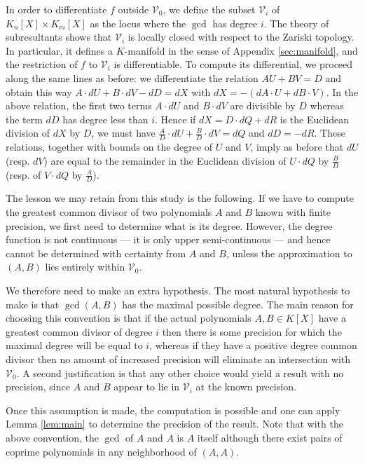 \documentclass{lms}
\begin{document}
In order to differentiate $f$ outside $\mathcal V_0$, we 
define the subset $\mathcal V_i$ of $K_n[X] \times 
K_m[X]$ as the locus where the $\gcd$ has degree $i$. The theory of 
subresultants shows that $\mathcal V_i$ is locally closed with respect to 
the Zariski topology. In particular, it defines a $K$-manifold in the 
sense of Appendix \ref{sec:manifold}, and the 
restriction of $f$ to $\mathcal V_i$ is differentiable. To compute
its differential, we proceed along the same lines as before: we 
differentiate the relation $AU + BV = D$ and obtain this way
$A \cdot dU + B \cdot dV - dD = dX$
with $dX = - (dA \cdot U + dB \cdot V)$. In the above relation, the
first two terms $A{\cdot}dU$ and $B{\cdot}dV$ are divisible by $D$ 
whereas the term $dD$ has degree less than $i$. 
Hence if $dX = D \cdot dQ + dR$ is the Euclidean division of $dX$ by $D$, 
we must have $\frac A D \cdot dU + \frac B D \cdot dV = dQ$ and $dD = 
-dR$. These relations, together with bounds on the degree of $U$ and $V$,
imply as before that $dU$ (resp. $dV$) are equal to the remainder in the
Euclidean division of $U{\cdot}dQ$ by $\frac B D$ (resp. of $V{\cdot}dQ$
by $\frac A D$).

\medskip

The lesson we may retain from this study is the following. If we have to 
compute the greatest common divisor of two polynomials $A$ and $B$ known 
with finite precision, we first need to determine what is its degree. 
However, the degree function is not continuous --- it is only upper 
semi-continuous --- and hence cannot be determined with certainty from $A$ and 
$B$, unless the approximation to $(A,B)$ lies entirely within $\mathcal V_0$.

We therefore need to make an extra hypothesis.  The most natural hypothesis to make
is that $\gcd(A, B)$ has the maximal possible degree.  The main reason for choosing
this convention is that if the actual polynomials $A, B \in K[X]$ have a greatest common
divisor of degree $i$ then there is some precision for which the maximal degree will be
equal to $i$, whereas if they have a positive
degree common divisor then no amount of increased precision will eliminate an intersection
with $\mathcal V_0$.  A second justification is that any other choice would yield a result
with no precision, since $A$ and $B$ appear to lie in $\mathcal V_i$ at the known precision.


Once this assumption is made, the computation is possible and one can apply Lemma 
\ref{lem:main} to determine the precision of the result.
Note that with the above convention, the $\gcd$ of $A$ and $A$ is $A$ 
itself although there exist pairs of coprime polynomials in any 
neighborhood of $(A,A)$.
\end{document}
